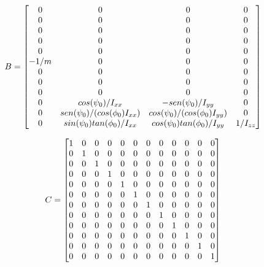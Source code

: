 \begin{equation*}
B =
\left[\begin{array}{@{}*{4}{c}@{}}
	0 & 0 & 0 & 0 \\
	0 & 0 & 0 & 0 \\
	0 & 0 & 0 & 0 \\
	0 & 0 & 0 & 0 \\
	0 & 0 & 0 & 0 \\
	-1/m & 0 & 0 & 0 \\
	0 & 0 & 0 & 0 \\
	0 & 0 & 0 & 0 \\
	0 & 0 & 0 & 0 \\
	0 & cos(\psi_0)/I_{xx} & -sen(\psi_0)/I_{yy} & 0 \\
	0 & sen(\psi_0)/(cos(\phi_0)I_{xx}) & cos(\psi_0)/(cos(\phi_0)I_{yy}) & 0\\
	0 & sin(\psi_0)tan(\phi_0)/I_{xx} & cos(\psi_0)
	tan(\phi_0)/I_{yy} & 1/I_{zz} \\
\end{array}\right]
\end{equation*}

\begin{equation*}
C =
\left[ \begin{array}{@{}*{12}{c}@{}}
	1 & 0 & 0 & 0 & 0 & 0 & 0 & 0 & 0 & 0 & 0 & 0 \\
	0 & 1 & 0 & 0 & 0 & 0 & 0 & 0 & 0 & 0 & 0 & 0 \\
	0 & 0 & 1 & 0 & 0 & 0 & 0 & 0 & 0 & 0 & 0 & 0 \\
	0 & 0 & 0 & 1 & 0 & 0 & 0 & 0 & 0 & 0 & 0 & 0 \\
	0 & 0 & 0 & 0 & 1 & 0 & 0 & 0 & 0 & 0 & 0 & 0 \\
	0 & 0 & 0 & 0 & 0 & 1 & 0 & 0 & 0 & 0 & 0 & 0 \\
	0 & 0 & 0 & 0 & 0 & 0 & 1 & 0 & 0 & 0 & 0 & 0 \\
	0 & 0 & 0 & 0 & 0 & 0 & 0 & 1 & 0 & 0 & 0 & 0 \\
	0 & 0 & 0 & 0 & 0 & 0 & 0 & 0 & 1 & 0 & 0 & 0 \\
	0 & 0 & 0 & 0 & 0 & 0 & 0 & 0 & 0 & 1 & 0 & 0 \\
	0 & 0 & 0 & 0 & 0 & 0 & 0 & 0 & 0 & 0 & 1 & 0 \\
	0 & 0 & 0 & 0 & 0 & 0 & 0 & 0 & 0 & 0 & 0 & 1 \\
\end{array}\right]
\end{equation*}

